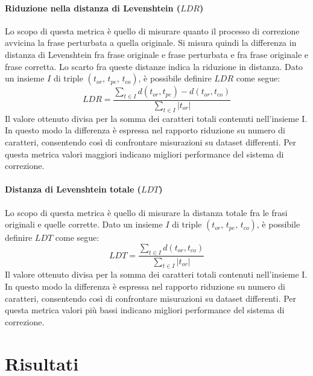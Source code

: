 \paragraph{Riduzione nella distanza di Levenshtein ($LDR$)}
Lo scopo di questa metrica è quello di misurare quanto il processo di correzione avvicina la frase perturbata a quella originale. Si misura quindi la differenza in distanza di Levenshtein fra frase originale e frase perturbata e fra frase originale e frase corretta. Lo scarto fra queste distanze indica la riduzione in distanza. Dato un insieme $I$ di triple $(\text{$t_{or}$, $t_{pe}$, $t_{co}$})$, è possibile definire $LDR$ come segue:
\begin{equation}
LDR = \frac{
\sum_{t \in I}d(t_{or},t_{pe}) - d(t_{or},t_{co})}{\sum_{t \in I}|t_{or}|}
\end{equation}
Il valore ottenuto divisa per la somma dei caratteri totali contenuti nell'insieme I. In questo modo la differenza è espressa nel rapporto riduzione su numero di caratteri, consentendo così di confrontare misurazioni su dataset differenti. Per questa metrica valori maggiori indicano migliori performance del sistema di correzione.


\paragraph{Distanza di Levenshtein totale ($LDT$)}
Lo scopo di questa metrica è quello di misurare la distanza totale fra le frasi originali e quelle corrette. Dato un insieme $I$ di triple $(\text{$t_{or}$, $t_{pe}$, $t_{co}$})$, è possibile definire $LDT$ come segue:
\begin{equation}
LDT = \frac{
\sum_{t \in I}d(t_{or},t_{co})}{\sum_{t \in I}|t_{or}|}
\end{equation}
Il valore ottenuto divisa per la somma dei caratteri totali contenuti nell'insieme I. In questo modo la differenza è espressa nel rapporto riduzione su numero di caratteri, consentendo così di confrontare misurazioni su dataset differenti. Per questa metrica valori più bassi indicano migliori performance del sistema di correzione.


\section{Risultati}
\label{sec:test_risultati}

